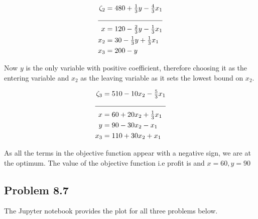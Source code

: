 \documentclass[letterpaper,12pt]{article}
\theoremstyle{definition}
\begin{document}
\begin{align*}
  \zeta_2 &= 480 + \tfrac{1}{3}y -\tfrac{4}{3}x_1\\
  \cline{1-2}
  x &= 120 -\tfrac{2}{3}y - \tfrac{1}{3}x_1\\
  x_2&= 30-\tfrac{1}{3}y+\tfrac{1}{3}x_1\\
  x_3 &= 200-y \\
\end{align*}

Now $y$ is the only variable with positive coefficient, therefore choosing it as the entering variable and $x_2$ as the leaving variable as it sets the lowest bound on $x_2$.

\begin{align*}
  \zeta_3 &= 510 -10x_2 - \tfrac{5}{3}x_1\\
  \cline{1-2}
  x &= 60 + 20x_2+\tfrac{1}{3}x_1\\
  y &= 90 - 30x_2-x_1\\
  x_3 &= 110+30x_2+x_1 \\
\end{align*}

\begin{flushleft}
As all the terms in the objective function appear with a negative sign, we are at the optimum.
The value of the objective function i.e profit is  and $x=60, y=90$
\end{flushleft}

\subsection*{Problem 8.7 }

The Jupyter notebook provides the plot for all three problems below. 
\end{document}
